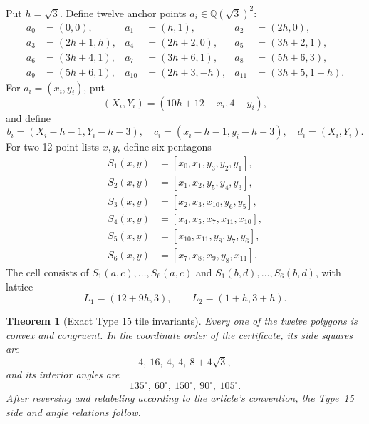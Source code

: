 \documentclass[11pt]{article}
\newtheorem{theorem}{Theorem}[section]
\theoremstyle{remark}
\newcommand{\Q}{\mathbb Q}
\newcommand{\Qsqrt}[1]{\Q(\sqrt{#1})}
\begin{document}
Put \(h=\sqrt3\).  Define twelve anchor points \(a_i\in\Qsqrt3^2\):
\begin{align*}
 a_0&=(0,0),&a_1&=(h,1),&a_2&=(2h,0),\\
 a_3&=(2h+1,h),&a_4&=(2h+2,0),&a_5&=(3h+2,1),\\
 a_6&=(3h+4,1),&a_7&=(3h+6,1),&a_8&=(5h+6,3),\\
 a_9&=(5h+6,1),&a_{10}&=(2h+3,-h),&a_{11}&=(3h+5,1-h).
\end{align*}
For \(a_i=(x_i,y_i)\), put
\[
 (X_i,Y_i)=(10h+12-x_i,4-y_i),
\]
and define
\[
 b_i=(X_i-h-1,Y_i-h-3),\quad
 c_i=(x_i-h-1,y_i-h-3),\quad
 d_i=(X_i,Y_i).
\]
For two 12-point lists \(x,y\), define six pentagons
\begin{align*}
 S_1(x,y)&=[x_0,x_1,y_3,y_2,y_1],\\
 S_2(x,y)&=[x_1,x_2,y_5,y_4,y_3],\\
 S_3(x,y)&=[x_2,x_3,x_{10},y_6,y_5],\\
 S_4(x,y)&=[x_4,x_5,x_7,x_{11},x_{10}],\\
 S_5(x,y)&=[x_{10},x_{11},y_8,y_7,y_6],\\
 S_6(x,y)&=[x_7,x_8,x_9,y_8,x_{11}].
\end{align*}
The cell consists of \(S_1(a,c),\ldots,S_6(a,c)\) and
\(S_1(b,d),\ldots,S_6(b,d)\), with lattice
\[
 L_1=(12+9h,3),
 \qquad
 L_2=(1+h,3+h).
\]

\begin{theorem}[Exact Type 15 tile invariants]
\label{thm:type15-invariants}
Every one of the twelve polygons is convex and congruent.  In the coordinate
order of the certificate, its side squares are
\[
 4,\ 16,\ 4,\ 4,\ 8+4\sqrt3,
\]
and its interior angles are
\[
 135^\circ,\ 60^\circ,\ 150^\circ,\ 90^\circ,\ 105^\circ.
\]
After reversing and relabeling according to the article's convention, the
Type~15 side and angle relations follow.
\end{theorem}
\end{document}
